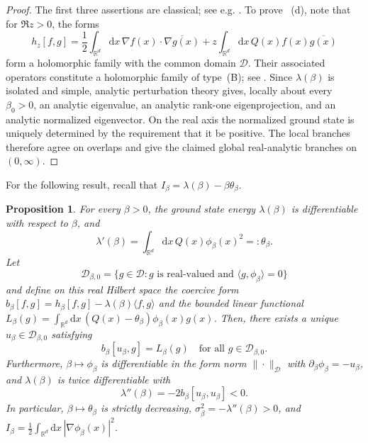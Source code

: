 \documentclass[11pt,reqno]{amsart}
\newtheorem{proposition}[theorem]{Proposition}
\theoremstyle{definition}
\numberwithin{equation}{section}
\newcommand{\<}{\langle}
\renewcommand{\>}{\rangle}
\def\de{{\rm d}}
\def\de{{\mathrm {d}}}
\begin{document}
\begin{appendix}
\begin{proof}
The first three assertions are classical; see e.g. \cite{LHB20}. To prove ~\textup{(d)}, note that for $\Re z>0$, the forms
\[
    h_z[f,g]
    =\frac12\int_{\mathbb R^d} \mathrm dx \, \nabla f(x)\cdot\overline{\nabla g(x)}
      +z\int_{\mathbb R^d}\mathrm dx \, Q(x)f(x)\overline{g(x)}
\]
form a holomorphic family with the common domain $\mathcal D$. Their associated
operators constitute a holomorphic family of type~\textup{(B)}; see
\cite[Chapter~VII, Section~4]{Kato}. Since $\lambda(\beta)$ is isolated and
simple, analytic perturbation theory gives, locally about every
$\beta_0>0$, an analytic eigenvalue, an analytic rank-one eigenprojection,
and an analytic normalized eigenvector. On the real axis the normalized
ground state is uniquely determined by the requirement that it be positive.
The local branches therefore agree on overlaps and give the claimed global
real-analytic branches on $(0,\infty)$.
\end{proof}

For the following result, recall that $I_\beta = \lambda(\beta) - \beta \theta_\beta$.


\begin{proposition}
\label{prop:hellmann-feynman}
For every $\beta > 0$, the ground state energy $\lambda(\beta)$ is differentiable with respect to $\beta$, and
\begin{equation}
\lambda'(\beta) = \int_{\mathbb{R}^d} \de x \, Q(x) \phi_{\beta}(x)^2  =: \theta_{\beta}.
\label{eq:hellmann_feynman}
\end{equation}
Let 
\[\mathcal{D}_{\beta,0} = \{g \in \mathcal{D} : g \text{ is real-valued and } \langle g, \phi_{\beta}\rangle = 0\}\]
and define on this real Hilbert space the coercive form $b_{\beta}[f,g] = h_{\beta}[f,g] - \lambda(\beta)\langle f,g\rangle$ and the bounded linear functional $L_{\beta}(g) = \int_{\mathbb{R}^d} \de x \, (Q(x) - \theta_{\beta})\phi_{\beta}(x)g(x) $.
Then, there exists a unique $u_{\beta} \in \mathcal{D}_{\beta,0}$ satisfying
\begin{equation}
b_{\beta}[u_{\beta}, g] = L_{\beta}(g) \quad \text{for all } g \in \mathcal{D}_{\beta,0}.
\label{eq:lax-milgram-u}
\end{equation}
Furthermore, $\beta \mapsto \phi_{\beta}$ is differentiable in the form norm $\|\cdot\|_{\mathcal{D}}$ with $\partial_{\beta}\phi_{\beta} = -u_{\beta}$, and $\lambda(\beta)$ is twice differentiable with
\begin{equation}
\lambda''(\beta) = -2 b_{\beta}[u_{\beta}, u_{\beta}] < 0.
\nonumber
\end{equation}
In particular, $\beta \mapsto \theta_{\beta}$ is strictly decreasing, $\sigma_{\beta}^2 = -\lambda''(\beta) > 0$, and $I_{\beta} = \frac{1}{2} \int_{\mathbb{R}^d} \de x \, |\nabla\phi_{\beta}(x)|^2$.
\end{proposition}


\end{appendix}
\end{document}
